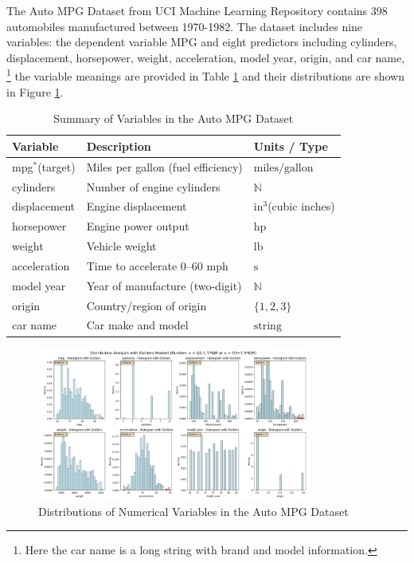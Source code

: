 \documentclass[12pt]{article}
\begin{document}
The Auto MPG Dataset from UCI Machine Learning Repository contains 398 automobiles manufactured between 1970-1982.
The dataset includes nine variables: the dependent variable MPG and eight predictors including cylinders, displacement, horsepower, weight, 
acceleration, model year, origin, and car name,
\footnote{Here the car name is a long string with brand and model information.}
the variable meanings are provided in Table \textcolor{blue}{\ref{tab:dataset_summary}} and their distributions are shown in Figure \textcolor{blue}{\ref{fig:numerical_distributions_with_outliers}}.

\begin{table}[!h]
\centering
\caption{Summary of Variables in the Auto MPG Dataset}
\label{tab:dataset_summary}
\begin{tabular}{p{3cm}p{7cm}p{3cm}}
\toprule
\textbf{Variable} & \textbf{Description} & \textbf{Units / Type} \\
\midrule
mpg\(^*\)(target) & Miles per gallon (fuel efficiency) & $\text{miles}/\text{gallon}$ \\
cylinders & Number of engine cylinders & $\mathbb{N}$ \\
displacement & Engine displacement & $\text{in}^3$(cubic inches) \\
horsepower & Engine power output & $\text{hp}$ \\
weight & Vehicle weight & $\text{lb}$ \\
acceleration & Time to accelerate 0–60 mph & $\text{s}$ \\
model year & Year of manufacture (two-digit) & $\mathbb{N}$ \\
origin & Country/region of origin & $\{1,2,3\}$ \\
car name & Car make and model & $\text{string}$ \\
\bottomrule
\end{tabular}
\end{table}

\begin{figure}[!h]
    \centering
    \includegraphics[width=0.8\textwidth]{../results/numerical_distributions_with_outliers.png}
    \caption{Distributions of Numerical Variables in the Auto MPG Dataset}
    \label{fig:numerical_distributions_with_outliers}
\end{figure}
\end{document}
